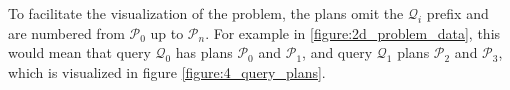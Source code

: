 To facilitate the visualization of the problem, the plans omit the $\mathcal{Q}_i$ prefix and are numbered from $\mathcal{P}_0$ up to $\mathcal{P}_n$. For example in \ref{figure:2d_problem_data}, this would mean that query $\mathcal{Q}_0$ has plans $\mathcal{P}_0$ and $\mathcal{P}_1$, and query $\mathcal{Q}_1$ plans $\mathcal{P}_2$ and $\mathcal{P}_3$, which is visualized in figure \ref{figure:4_query_plans}.

\begin{figure}[!h]
    \centering



\begin{tikzpicture}[x=0.75pt,y=0.75pt,yscale=-1,xscale=1]


\end{tikzpicture}
\end{figure}
